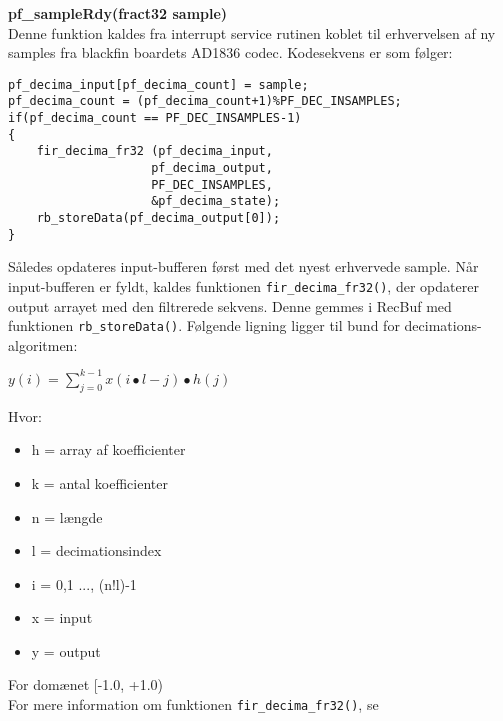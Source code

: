 \textbf{pf\_sampleRdy(fract32 sample)} \\
Denne funktion kaldes fra interrupt service rutinen koblet til erhvervelsen af ny samples fra blackfin boardets  AD1836 codec. Kodesekvens er som følger:
\begin{verbatim}
pf_decima_input[pf_decima_count] = sample;
pf_decima_count = (pf_decima_count+1)%PF_DEC_INSAMPLES;
if(pf_decima_count == PF_DEC_INSAMPLES-1)
{
	fir_decima_fr32 (pf_decima_input,
	                pf_decima_output,
	                PF_DEC_INSAMPLES,
	                &pf_decima_state);
	rb_storeData(pf_decima_output[0]);
}
\end{verbatim}
Således opdateres input-bufferen først med det nyest erhvervede sample. Når input-bufferen er fyldt, kaldes funktionen \verb+fir_decima_fr32()+, der opdaterer output arrayet med den filtrerede sekvens. Denne gemmes i RecBuf med funktionen \verb+rb_storeData()+.
Følgende ligning ligger til bund for decimations-algoritmen:
\begin{center}
$y\left( i \right) =\sum _{ j=0 }^{ k-1 }{ x\left( i\bullet l-j \right) \bullet h\left( j \right)  } $
\end{center}
Hvor:
\begin{itemize}
	\item h = array af koefficienter
	\item k = antal koefficienter
	\item n = længde
	\item l = decimationsindex
	\item i = {0,1 ..., (n!l)-1}
	\item x = input
	\item y = output
\end{itemize}
For domænet [-1.0, +1.0) \\
For mere information om funktionen \verb+fir_decima_fr32()+, se \citep[p. 943]{C_Cpp_man_for_bf}
